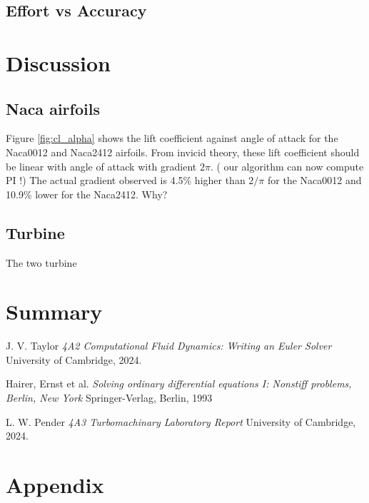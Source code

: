 \documentclass{article}
\begin{document}
\subsection{Effort vs Accuracy}

\section{Discussion}

\subsection{Naca airfoils}

Figure \ref{fig:cl_alpha} shows the lift coefficient against angle of attack for the Naca0012 and Naca2412 airfoils.
From invicid theory, these lift coefficient should be linear with angle of attack with gradient $ 2\pi $. ( our algorithm can now compute PI !)
The actual gradient observed is 4.5\% higher than $2/\pi$ for the Naca0012 and 10.9\% lower for the Naca2412.
Why?

\subsection{Turbine}

The two turbine 

\section{Summary}

\begin{thebibliography}{9}

    J. V. Taylor
    \emph{4A2 Computational Fluid Dynamics: Writing an Euler Solver}
    University of Cambridge,
    2024.

    Hairer, Ernst et al.
    \emph{Solving ordinary differential equations I: Nonstiff problems, Berlin, New York}
    Springer-Verlag, Berlin, 1993

    L. W. Pender
    \emph{4A3 Turbomachinary Laboratory Report}
    University of Cambridge,
    2024.
  
\end{thebibliography}

\section{Appendix}
\end{document}
